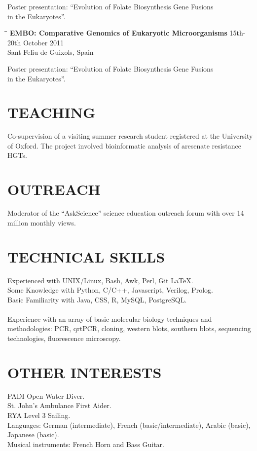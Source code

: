 \documentclass{res}
\begin{document}
\begin{resume}
\begin{tabbing}
   \end{tabbing}\vspace{-30pt}      
      Poster presentation: ``Evolution of Folate Biosynthesis Gene Fusions \\in the Eukaryotes''.
      
  
  
     \begin{tabbing} 
   \hspace{2in}\= \hspace{2.6in}\= \kill 
    {\bf EMBO: Comparative Genomics of Eukaryotic Microorganisms}
    \>  \> 15th-20th October 2011\\
                         \>    \> Sant Feliu de Guixols, Spain
   \end{tabbing}\vspace{-30pt}      
      Poster presentation: ``Evolution of Folate Biosynthesis Gene Fusions \\in the Eukaryotes''.
 
 
  \section{TEACHING}

Co-supervision of a visiting summer research student registered at the University of Oxford. The project involved bioinformatic analysis of aresenate resistance HGTs. 

 \section{OUTREACH}          
\vspace{0.1in}
Moderator of the ``AskScience'' science education outreach forum with over 14 million monthly views.

 \section{TECHNICAL SKILLS}
 \vspace{0.1in}
Experienced with UNIX/Linux, Bash,  Awk, Perl, Git \LaTeX. \\ 
Some Knowledge with Python, C/C++, Javascript, Verilog, Prolog.\\
Basic Familiarity with Java, CSS, R, MySQL, PostgreSQL.\\
\\ 
Experience with an array of basic molecular biology techniques and methodologies: PCR, qrtPCR, cloning, western blots, southern blots, sequencing technologies, fluorescence microscopy.

%  
 \section{OTHER INTERESTS}
 \vspace{0.1in}
PADI Open Water Diver.\\
St. John's Ambulance First Aider.\\
RYA Level 3 Sailing.\\
Languages: German (intermediate), French (basic/intermediate), Arabic (basic), Japanese (basic).\\
Musical instruments: French Horn and Bass Guitar. \\

\end{resume}
\end{document}
